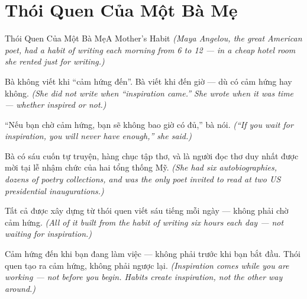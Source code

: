 \section{Thói Quen Của Một Bà Mẹ}
\begin{truyen}{Thói Quen Của Một Bà Mẹ}{A Mother's Habit}
\textit{(Maya Angelou, the great American poet, had a habit of writing each morning from 6 to 12 — in a cheap hotel room she rented just for writing.)}

Bà không viết khi ``cảm hứng đến''. Bà viết khi đến giờ — dù có cảm hứng hay không.
\textit{(She did not write when ``inspiration came.'' She wrote when it was time — whether inspired or not.)}

``Nếu bạn chờ cảm hứng, bạn sẽ không bao giờ có đủ,'' bà nói.
\textit{(``If you wait for inspiration, you will never have enough,'' she said.)}

Bà có sáu cuốn tự truyện, hàng chục tập thơ, và là người đọc thơ duy nhất được mời tại lễ nhậm chức của hai tổng thống Mỹ.
\textit{(She had six autobiographies, dozens of poetry collections, and was the only poet invited to read at two US presidential inaugurations.)}

Tất cả được xây dựng từ thói quen viết sáu tiếng mỗi ngày — không phải chờ cảm hứng.
\textit{(All of it built from the habit of writing six hours each day — not waiting for inspiration.)}

\end{truyen}

\begin{baihoc}
Cảm hứng đến khi bạn đang làm việc — không phải trước khi bạn bắt đầu. Thói quen tạo ra cảm hứng, không phải ngược lại.
\textit{(Inspiration comes while you are working — not before you begin. Habits create inspiration, not the other way around.)}
\end{baihoc}
